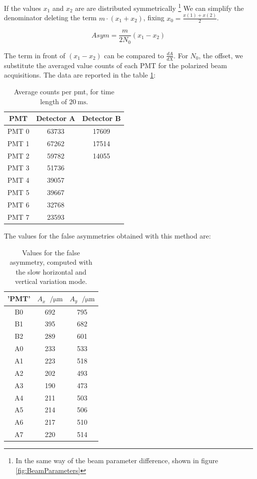If the values $x_{1}$ and $x_{2}$ are are distributed symmetrically \footnote{ In the same way of the beam parameter difference, shown in figure \ref{fig:BeamParameters}} We can simplify the denominator deleting the term $ m \cdot (x_{1} +  x_{2})$, fixing $x_{0} = \frac{x(1) + x(2)}{2}$. 

\begin{equation}
Asym = \dfrac{m}{2N_{0}}(x_{1} -  x_{2})
\end{equation}

The term in front of $(x_{1} - x_{2})$ can be compared to $\frac{dA}{dX}$. For $N_{0}$, the offset, we substitute the averaged value counts of each PMT for the polarized beam acquisitions.
The data are reported in the table \ref{tab:RateCarbon}:

\begin{table}[h]
\centering
\begin{tabular}{c|c|c}
\hline 
PMT & Detector A & Detector B \\ 
\hline
PMT 0 & 63733 & 17609 \\ 
PMT 1 & 67262 & 17514 \\ 
PMT 2 & 59782 & 14055 \\ 
PMT 3 & 51736 & \\ 
PMT 4 & 39057 & \\ 
PMT 5 & 39667 & \\ 
PMT 6 & 32768 & \\ 
PMT 7 & 23593 & \\ 
\hline 
\end{tabular}
\caption{Average counts per pmt, for time length of $\SI{20}{\milli \second}$.} 
\label{tab:RateCarbon}
\end{table}
 
The values for the false asymmetries obtained with this method are:

\begin{table}[h]
\centering
\begin{tabular}{c|c|c}
\hline
 'PMT' & $A_{x}$ $\SI{}{\per \micro \meter}$&   $A_{y}$ $\SI{}{\per \micro \meter}$ \\
\hline
 B0 & 692 & 795 \\
 B1 & 395 & 682 \\
 B2 & 289 & 601 \\
 A0 & 233 & 533 \\
 A1 & 223 & 518 \\
 A2 & 202 & 493 \\
 A3 & 190 & 473 \\
 A4 & 211 & 503 \\
 A5 & 214 & 506 \\
 A6 & 217 & 510 \\
 A7 & 220 & 514 \\
\hline
\end{tabular}
\caption{ Values for the false asymmetry, computed with the slow horizontal and vertical variation mode.}
\end{table}

